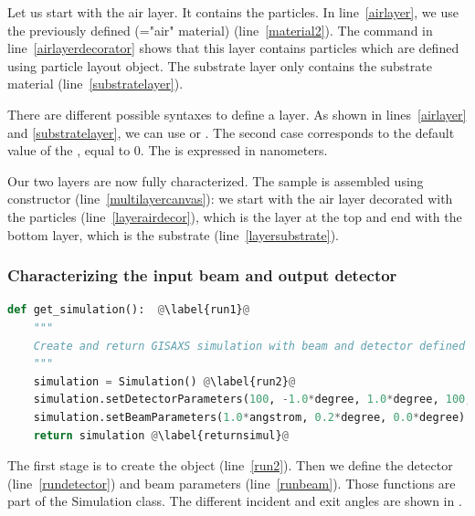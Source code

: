 Let us start with the air layer. It contains the particles. In
line~\ref{airlayer}, we use the previously defined 
(="air" material) (line~\ref{material2}). The command in line~\ref{airlayerdecorator} shows that this layer contains particles
which are defined using particle layout object. The substrate layer
only contains the substrate material (line~\ref{substratelayer}).
 
There are different possible syntaxes to define a layer. As shown in
lines~\ref{airlayer} and \ref{substratelayer}, we can use
 or
. The second case corresponds
to the default value of the , equal to 0. The  is
expressed in  nanometers.

Our two layers are now fully characterized. The sample is assembled using
 constructor (line~\ref{multilayercanvas}): we start with the air layer decorated
with the particles (line~\ref{layerairdecor}), which is the layer at
the top and end with the bottom layer, which is the
substrate (line~\ref{layersubstrate}).


%
\subsubsection{Characterizing the input beam and
output detector}

\begin{lstlisting}[language=python, style=eclipseboxed,name=ex1,nolol]
def get_simulation():  @\label{run1}@
    """
    Create and return GISAXS simulation with beam and detector defined
    """
    simulation = Simulation() @\label{run2}@
    simulation.setDetectorParameters(100, -1.0*degree, 1.0*degree, 100, 0.0*degree, 2.0*degree) @\label{rundetector}@
    simulation.setBeamParameters(1.0*angstrom, 0.2*degree, 0.0*degree) @\label{runbeam}@
    return simulation @\label{returnsimul}@
\end{lstlisting}
The first stage is to create the  object (line~\ref{run2}). Then we define the detector (line~\ref{rundetector}) and beam
parameters (line~\ref{runbeam}). %
Those functions are part of the Simulation
class.  The different incident and exit angles are
shown in .


